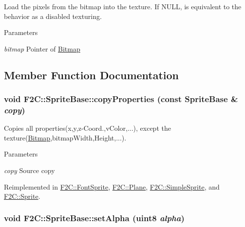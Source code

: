 Load the pixels from the bitmap into the texture. If NULL, is equivalent to the behavior as a disabled texturing. 
\begin{DoxyParams}{Parameters}
\item[{\em bitmap}]Pointer of \hyperlink{class_f2_c_1_1_bitmap}{Bitmap} \end{DoxyParams}


\subsection{Member Function Documentation}
\hypertarget{class_f2_c_1_1_sprite_base_a8f7ea8a95a07688bfb2e6268a52b9215}{
\subsubsection[{copyProperties}]{\setlength{\rightskip}{0pt plus 5cm}void F2C::SpriteBase::copyProperties (const {\bf SpriteBase} \& {\em copy})}}
\label{class_f2_c_1_1_sprite_base_a8f7ea8a95a07688bfb2e6268a52b9215}


Copies all properties(x,y,z-\/Coord.,vColor,...), except the texture(\hyperlink{class_f2_c_1_1_bitmap}{Bitmap},bitmapWidth,Height,...). 
\begin{DoxyParams}{Parameters}
\item[{\em copy}]Source copy \end{DoxyParams}


Reimplemented in \hyperlink{class_f2_c_1_1_font_sprite_a36a224f59737fb06c4d79ee48b7e4068}{F2C::FontSprite}, \hyperlink{class_f2_c_1_1_plane_ac3ee4529b515cc641b6e9b27d76fc2ef}{F2C::Plane}, \hyperlink{class_f2_c_1_1_simple_sprite_a1aa8944250c186b4a88c7bf7850fbb67}{F2C::SimpleSprite}, and \hyperlink{class_f2_c_1_1_sprite_a33d27869102b12705666a1712d9f645d}{F2C::Sprite}.\hypertarget{class_f2_c_1_1_sprite_base_a476e1be82005a18cce5989a478d3f5a4}{
\subsubsection[{setAlpha}]{\setlength{\rightskip}{0pt plus 5cm}void F2C::SpriteBase::setAlpha ({\bf uint8} {\em alpha})}}
\label{class_f2_c_1_1_sprite_base_a476e1be82005a18cce5989a478d3f5a4}


